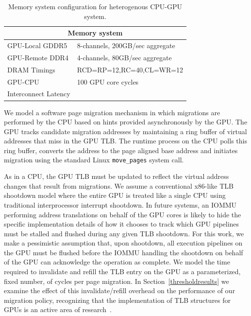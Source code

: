 \begin{table}[t]
\begin{center}
\begin{tabular}{|l|l|}
\hline
\multicolumn{2}{|c|}{Memory system}\\
\hline
GPU-Local GDDR5 & 8-channels, 200GB/sec aggregate\\
\hline
GPU-Remote DDR4& 4-channels, 80GB/sec aggregate\\
\hline
DRAM Timings & \multicolumn{1}{|l|}{RCD=RP=12,RC=40,CL=WR=12}\\
\hline
GPU-CPU &  100 GPU core cycles\\
Interconnect Latency & \\
\hline
\end{tabular}
\caption{Memory system configuration for heterogenous CPU-GPU system.}
\label{tab:mig-methodology}
\end{center}
\end{table}

We model a software page migration mechanism in which migrations are performed
by the CPU based on hints provided asynchronously by the GPU\@.  The GPU tracks
candidate migration addresses by maintaining a ring buffer of virtual addresses
that miss in the GPU TLB.  The runtime process on the CPU polls this ring
buffer, converts the address to the page aligned base address and initiates
migration using the standard Linux {\tt move\_pages} system call.

As in a CPU, the GPU TLB must be updated to reflect the virtual address changes
that result from migrations.  We assume a conventional x86-like TLB shootdown
model where the entire GPU is treated like a single CPU using traditional
interprocessor interrupt shootdown.  In future systems, an IOMMU performing
address translations on behalf of the GPU cores is likely to hide the specific
implementation details of how it chooses to track which GPU pipelines must be
stalled and flushed during any given TLB shootdown.  For this work, we make a
pessimistic assumption that, upon shootdown, all execution pipelines on the GPU
must be flushed before the IOMMU handling the shootdown on behalf of the GPU can
acknowledge the operation as complete. We model the time required to invalidate
and refill the TLB entry on the GPU as a parameterized, fixed number, of cycles
per page migration. In Section~\ref{thresholdresults} we examine the effect of
this invalidate/refill overhead on the performance of our migration policy,
recognizing that the implementation of TLB structures for GPUs is an active area
of research~\cite{Pichai2014,Power2014}.

